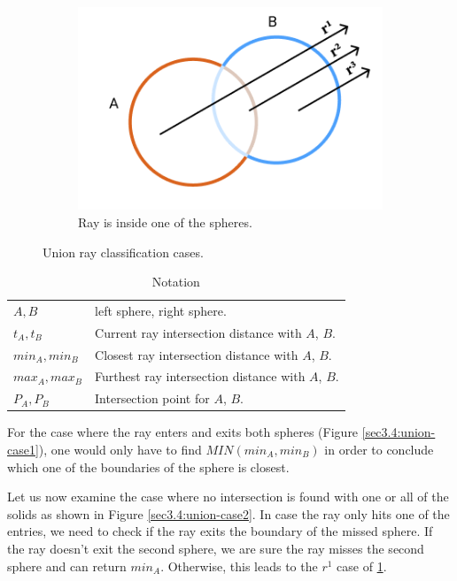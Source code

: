 \documentclass[a4paper,11pt,oneside]{article}
\begin{document}
\begin{figure}[ht]
\begin{subfigure}[b]{0.3\textwidth}
         \includegraphics[width=\textwidth]{section3/3.4/union-case-3.png}
         \caption{Ray is inside one of the spheres.}
         \label{sec3.4:union-case3}
     \end{subfigure}
        \caption{Union ray classification cases.}
        \label{sec3.4:sphere-union}
\end{figure}

\begin{table}
	\caption{Notation}
	\label{table:notations2}
	\begin{tabularx}{\textwidth}{p{}X}
		\toprule
		$A, B$									     & left sphere, right sphere. 						   \\
		$t_A, t_B$                                   & Current ray intersection distance with $A$, $B$.   \\
		$min_A, min_B$                               & Closest ray intersection distance with $A$, $B$.   \\
		$max_A, max_B$                               & Furthest ray intersection distance with $A$, $B$.  \\
		$P_A, P_B$                                   & Intersection point for $A$, $B$. \\
		\bottomrule
	\end{tabularx}
\end{table}

For the case where the ray enters and exits both spheres (Figure \ref{sec3.4:union-case1}), one would only have to find $MIN(min_A, min_B)$ in order to conclude which one of the boundaries of the sphere is closest.

Let us now examine the case where no intersection is found with one or all of the solids as shown in Figure \ref{sec3.4:union-case2}. In case the ray only hits one of the entries, we need to check if the ray exits the boundary of the missed sphere. If the ray doesn't exit the second sphere, we are sure the ray misses the second sphere and can return $min_A$. Otherwise, this leads to the $r^1$ case of \ref{sec3.4:union-case3}.
\end{document}
